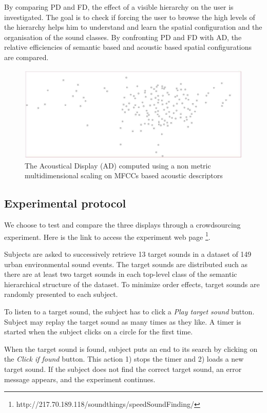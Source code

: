 \documentclass{aes2e}
\begin{document}
By comparing PD and FD, the effect of a visible hierarchy on the user is investigated. The goal is to check if forcing the user to browse the high levels of the hierarchy helps him to understand and learn the spatial configuration and the organisation of the sound classes. By confronting PD and FD with AD, the relative efficiencies of semantic based and acoustic based spatial configurations are compared. 

\begin{figure}[t]
\begin{center}
\includegraphics[scale=0.18]{gfx/XP3.pdf} 
\end{center}
\caption{\label{figXP3} The Acoustical Display (AD) computed using  a non metric multidimensional scaling on  MFCCs based acoustic descriptors}
\end{figure}

\subsection{Experimental protocol}
We choose to test and compare the three displays through a crowdsourcing experiment. Here is the link to access the experiment web page \footnote{http://217.70.189.118/soundthings/speedSoundFinding/}.

Subjects are asked to successively retrieve 13 target sounds in a dataset of 149 urban environmental sound events. The target sounds are distributed such as there are at least two target sounds in each top-level class of the semantic hierarchical structure of the dataset. To minimize order effects, target sounds are randomly presented to each subject.

To listen to a target sound, the subject has to click a \textit{Play target sound} button. Subject may replay the target sound  as many times as they like. A timer is started when the subject clicks on a circle for the first time.

When the target sound is found, subject puts an end to its search by clicking on the \textit{Click if found} button. This action 1) stops the timer and 2) loads a new target sound. If the subject does not find the correct target sound, an error message appears, and the experiment continues.
\end{document}
